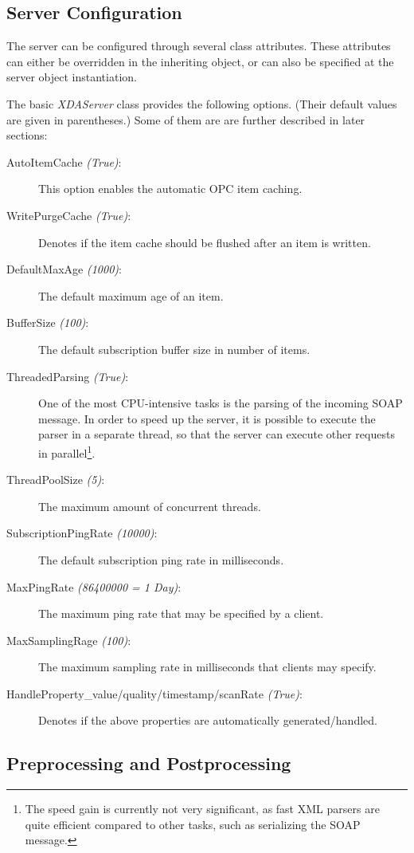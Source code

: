 \subsection*{Server Configuration}

The server can be configured through several class attributes. These
attributes can either be overridden in the inheriting object, or can
also be specified at the server object instantiation.

The basic {\sl XDAServer} class provides the following options. (Their
default values are given in parentheses.) Some of them are are further
described in later sections:

\begin{description}

\item[AutoItemCache {\sl (True)}:] This option enables the automatic
OPC item caching.
\item[WritePurgeCache {\sl (True)}:] Denotes if the item cache should be
flushed after an item is written. 
\item[DefaultMaxAge {\sl (1000)}:] The default maximum age of an item.
\item[BufferSize {\sl (100)}:] The default subscription buffer size in
number of items.
\item[ThreadedParsing {\sl (True)}:] One of the most CPU-intensive
tasks is the parsing of the incoming SOAP message. In order to speed
up the server, it is possible to execute the parser in a separate
thread, so that the server can execute other requests in
parallel\footnote{The speed gain is currently not very significant, as
fast XML parsers are quite efficient compared to other tasks, such as
serializing the SOAP message.}.
\item[ThreadPoolSize {\sl (5)}:] The maximum amount of concurrent
threads.
\item[SubscriptionPingRate {\sl (10000)}:] The default subscription ping
rate in milliseconds.
\item[MaxPingRate {\sl (86400000 = 1 Day)}:] The maximum ping rate that
may be specified by a client.
\item[MaxSamplingRage {\sl (100)}:] The maximum sampling rate in
milliseconds that clients may specify.
\item[HandleProperty\_value/quality/timestamp/scanRate {\sl (True)}:]
Denotes if the above properties are automatically generated/handled.
\end{description}

\subsection{Preprocessing and Postprocessing}

